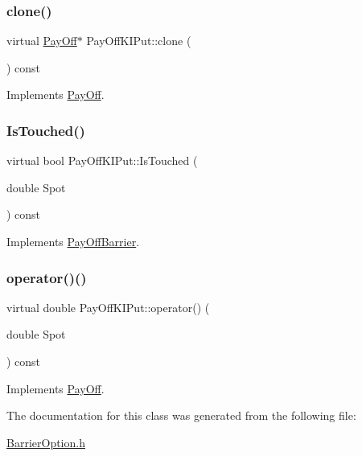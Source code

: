 \subsubsection{\texorpdfstring{clone()}{clone()}}
{\footnotesize\ttfamily virtual \hyperlink{classPayOff}{Pay\+Off}$\ast$ Pay\+Off\+K\+I\+Put\+::clone (\begin{DoxyParamCaption}{ }\end{DoxyParamCaption}) const\hspace{0.3cm}{\ttfamily [virtual]}}



Implements \hyperlink{classPayOff_ad8194d5b82247ae89c25c515f0ba806a}{Pay\+Off}.

\hypertarget{classPayOffKIPut_a0f62d8559620b09b97f31ce052ad061c}{}\label{classPayOffKIPut_a0f62d8559620b09b97f31ce052ad061c} 
\subsubsection{\texorpdfstring{Is\+Touched()}{IsTouched()}}
{\footnotesize\ttfamily virtual bool Pay\+Off\+K\+I\+Put\+::\+Is\+Touched (\begin{DoxyParamCaption}\item[{double}]{Spot }\end{DoxyParamCaption}) const\hspace{0.3cm}{\ttfamily [virtual]}}



Implements \hyperlink{classPayOffBarrier_a2aa9162c618c4f72a6593dc625e1e1e8}{Pay\+Off\+Barrier}.

\hypertarget{classPayOffKIPut_a50dc6bc5327116097c208ae470567b86}{}\label{classPayOffKIPut_a50dc6bc5327116097c208ae470567b86} 
\subsubsection{\texorpdfstring{operator()()}{operator()()}}
{\footnotesize\ttfamily virtual double Pay\+Off\+K\+I\+Put\+::operator() (\begin{DoxyParamCaption}\item[{double}]{Spot }\end{DoxyParamCaption}) const\hspace{0.3cm}{\ttfamily [virtual]}}



Implements \hyperlink{classPayOff_a5ae17d82c233ef5568c8fb0539703000}{Pay\+Off}.



The documentation for this class was generated from the following file\+:\begin{DoxyCompactItemize}
\item 
\hyperlink{BarrierOption_8h}{Barrier\+Option.\+h}\end{DoxyCompactItemize}
